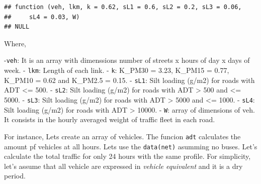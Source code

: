 \documentclass[12pt,graybox,envcountchap,sectrefs]{krantz}
\makeatletter
\newenvironment{Shaded}{\begin{snugshade}}{\end{snugshade}}
\newcommand{\KeywordTok}[1]{\textcolor[rgb]{0.13,0.29,0.53}{\textbf{#1}}}
\newcommand{\DecValTok}[1]{\textcolor[rgb]{0.00,0.00,0.81}{#1}}
\newcommand{\FloatTok}[1]{\textcolor[rgb]{0.00,0.00,0.81}{#1}}
\newcommand{\StringTok}[1]{\textcolor[rgb]{0.31,0.60,0.02}{#1}}
\newcommand{\OperatorTok}[1]{\textcolor[rgb]{0.81,0.36,0.00}{\textbf{#1}}}
\newcommand{\NormalTok}[1]{#1}
\newenvironment{kframe}{%
\medskip{}
\setlength{\fboxsep}{.8em}
 \def\at@end@of@kframe{}%
 \ifinner\ifhmode%
  \def\at@end@of@kframe{\end{minipage}}%
  \begin{minipage}{\columnwidth}%
 \fi\fi%
 \def\FrameCommand##1{\hskip\@totalleftmargin \hskip-\fboxsep
 \colorbox{shadecolor}{##1}\hskip-\fboxsep
     \hskip-\linewidth \hskip-\@totalleftmargin \hskip\columnwidth}%
 \MakeFramed {\advance\hsize-\width
   \@totalleftmargin\z@ \linewidth\hsize
   \@setminipage}}%
 {\par\unskip\endMakeFramed%
 \at@end@of@kframe}
\renewenvironment{Shaded}{\begin{kframe}}{\end{kframe}}
\theoremstyle{definition}
\theoremstyle{definition}
\theoremstyle{definition}
\theoremstyle{remark}
\makeatother
\begin{document}
\begin{verbatim}
## function (veh, lkm, k = 0.62, sL1 = 0.6, sL2 = 0.2, sL3 = 0.06, 
##     sL4 = 0.03, W) 
## NULL
\end{verbatim}

Where,

-\texttt{veh}: It is an array with dimenssions number of streets x hours
of day x days of week. - \texttt{lkm}: Length of each link. -
\texttt{k}: K\_PM30 = 3.23, K\_PM15 = 0.77, K\_PM10 = 0.62 and K\_PM2.5
= 0.15. - \texttt{sL1}: Silt loading (g/m2) for roads with ADT
\textless{}= 500. - \texttt{sL2}: Silt loading (g/m2) for roads with ADT
\textgreater{} 500 and \textless{}= 5000. - \texttt{sL3}: Silt loading
(g/m2) for roads with ADT \textgreater{} 5000 and \textless{}= 1000. -
\texttt{sL4}: Silt loading (g/m2) for roads with ADT \textgreater{}
10000. - \texttt{W}: array of dimensions of veh. It consists in the
hourly averaged weight of traffic fleet in each road.

For instance, Lets create an array of vehicles. The funcion \texttt{adt}
calculates the amount pf vehicles at all hours. Lets use the
\texttt{data(net)} asumming no buses. Let's calculate the total traffic
for only 24 hours with the same profile. For simplicity, let's assume
that all vehicle are expressed in \emph{vehicle equivalent} and it is a
dry period.

\begin{Shaded}
\end{Shaded}
\end{document}
